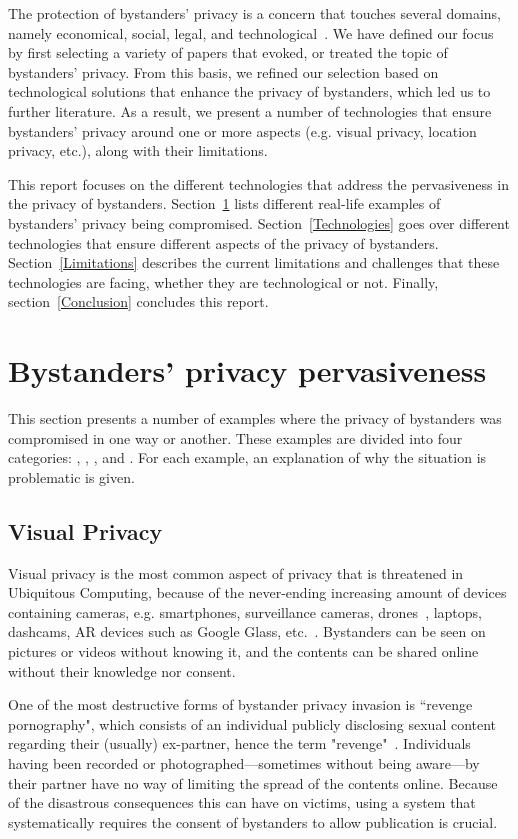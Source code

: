 \documentclass[conference]{IEEEtran}
\begin{document}
The protection of bystanders' privacy is a concern that touches several domains, namely economical, social, legal, and technological~\cite{lu2017privacy}. We have defined our focus by first selecting a variety of papers that evoked, or treated the topic of bystanders' privacy. From this basis, we refined our selection based on technological solutions that enhance the privacy of bystanders, which led us to further literature. As a result, we present a number of technologies that ensure bystanders' privacy around one or more aspects (e.g. visual privacy, location privacy, etc.), along with their limitations.

This report focuses on the different technologies that address the pervasiveness in the privacy of bystanders. Section~\ref{BystandersPrivacy} lists different real-life examples of bystanders' privacy being compromised. Section~\ref{Technologies} goes over different technologies that ensure different aspects of the privacy of bystanders. Section~\ref{Limitations} describes the current limitations and challenges that these technologies are facing, whether they are technological or not. Finally, section~\ref{Conclusion} concludes this report.

\section{Bystanders’ privacy pervasiveness}\label{BystandersPrivacy}
This section presents a number of examples where the privacy of bystanders was compromised in one way or another. These examples are divided into four categories: , , , and . For each example, an explanation of why the situation is problematic is given.

\subsection{Visual Privacy}\label{Videos}
Visual privacy is the most common aspect of privacy that is threatened in Ubiquitous Computing, because of the never-ending increasing amount of devices containing cameras, e.g. smartphones, surveillance cameras, drones~\cite{yao2017privacy}, laptops, dashcams, \ac{AR} devices such as Google Glass, etc.~\cite{lu2017privacy, yao2017privacy, chinomi2008PriSurv}. Bystanders can be seen on pictures or videos without knowing it, and the contents can be shared online without their knowledge nor consent. 

One of the most destructive forms of bystander privacy invasion is ``revenge pornography", which consists of an individual publicly disclosing sexual content regarding their (usually) ex-partner, hence the term "revenge"~\cite{olteanu2018consensual}. Individuals having been recorded or photographed---sometimes without being aware---by their partner have no way of limiting the spread of the contents online. Because of the disastrous consequences this can have on victims, using a system that systematically requires the consent of bystanders to allow publication is crucial.
\end{document}
